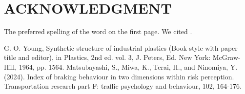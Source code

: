 \documentclass[letterpaper, 10 pt, conference]{ieeeconf}  %
\begin{document}
\section*{ACKNOWLEDGMENT}
The preferred spelling of the word on the first page. We cited \cite{c2}.

\begin{thebibliography}{99}

 G. O. Young, Synthetic structure of industrial plastics (Book style with paper title and editor), in Plastics, 2nd ed. vol. 3, J. Peters, Ed.  New York: McGraw-Hill, 1964, pp. 1564.
 Matsubayashi, S., Miwa, K., Terai, H., and Ninomiya, Y. (2024). Index of braking behaviour in two dimensions within risk perception. Transportation research part F: traffic psychology and behaviour, 102, 164-176.

\end{thebibliography}
\end{document}
